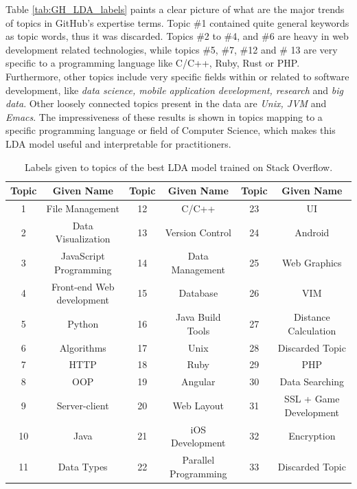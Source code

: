             Table \ref{tab:GH_LDA_labels} paints a clear picture of what are the major trends of topics in GitHub's expertise terms. Topic \#1 contained quite general keywords as topic words, thus it was discarded. Topics \#2 to \#4, and \#6 are heavy in web development related technologies, while topics \#5, \#7, \#12 and \# 13 are very specific to a programming language like C/C++, Ruby, Rust or PHP. Furthermore, other topics include very specific fields within or related to software development, like \emph{data science, mobile application development, research} and \emph{big data}. Other loosely connected topics present in the data are \emph{Unix, JVM} and \emph{Emacs}. The impressiveness of these results is shown in topics mapping to a specific programming language or field of Computer Science, which makes this LDA model useful and interpretable for practitioners.  
            
            \begin{table}
              \centering
              \caption{Labels given to topics of the best LDA model trained on Stack Overflow.}\label{tab:SO_LDA_labels}
                \vspace{6pt} %
               \resizebox{\textwidth}{!} {
              \begin{tabular}{|c c|c c|c c|}
                \hline
                Topic & Given Name & Topic & Given Name & Topic & Given Name \\
                \hline
                1 & File Management & 12 & C/C++ & 23 & UI \\
                2 & Data Visualization & 13 & Version Control & 24 & Android \\
                3 & JavaScript Programming & 14 & Data Management & 25 & Web Graphics \\
                4 & Front-end Web development & 15 & Database & 26 & VIM \\
                5 & Python & 16 & Java Build Tools & 27 & Distance Calculation \\
                6 & Algorithms & 17 & Unix & 28 & Discarded Topic \\
                7 & HTTP & 18 & Ruby & 29 & PHP \\
                8 & OOP & 19 & Angular & 30 & Data Searching \\
                9 & Server-client & 20 & Web Layout & 31 & SSL + Game Development \\
                10 & Java & 21 & iOS Development & 32 & Encryption \\
                11 & Data Types & 22 & Parallel Programming & 33 & Discarded Topic \\
                \hline
              \end{tabular}}
            \end{table}
            
